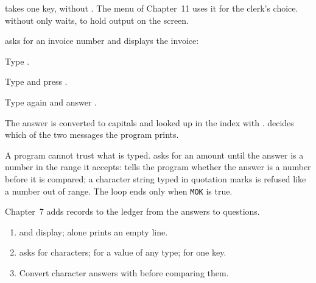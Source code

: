  takes one key, without .  The menu of Chapter~11 uses it
for the clerk's choice.   without  only waits, to hold output
on the screen.

 asks for an invoice number and displays the invoice:
\begin{Steps}
\item Type .
\item Type  and press .
\item Type  again and answer .
\end{Steps}
The answer is converted to capitals and looked up in the index 
with .   decides which of the two messages the program
prints.

A program cannot trust what is typed.   asks for an amount
until the answer is a number in the range it accepts:
 tells the program whether the answer is a number before it is
compared; a character string typed in quotation marks is refused like a number
out of range.  The loop ends only when \texttt{MOK} is true.

Chapter~7 adds records to the ledger from the answers to questions.

\begin{enumerate}
\item {} and  display;  alone prints an empty line.
\item {} asks for characters;  for a value of any type;
   for one key.
\item Convert character answers with  before comparing them.
\end{enumerate}
